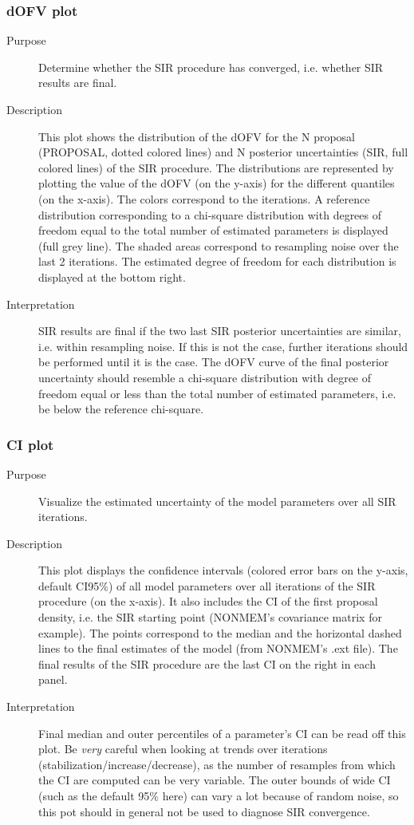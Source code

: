 \subsubsection{dOFV plot}
\begin{description}
\item[Purpose] Determine whether the SIR procedure has converged, i.e. whether SIR results are final.
\item[Description] This plot shows the distribution of the dOFV for the N proposal (PROPOSAL, dotted colored lines) and N posterior uncertainties (SIR, full colored lines) of the SIR procedure. The distributions are represented by plotting the value of the dOFV (on the y-axis) for the different quantiles (on the x-axis). The colors correspond to the iterations. A reference distribution corresponding to a chi-square distribution with degrees of freedom equal to the total number of estimated parameters is displayed (full grey line). The shaded areas correspond to resampling noise over the last 2 iterations. The estimated degree of freedom for each distribution is displayed at the bottom right.
\item[Interpretation] SIR results are final if the two last SIR posterior uncertainties are similar, i.e. within resampling noise. If this is not the case, further iterations should be performed until it is the case. The dOFV curve of the final posterior uncertainty should resemble a chi-square distribution with degree of freedom equal or less than the total number of estimated parameters, i.e. be below the reference chi-square.
\end{description}
\subsubsection{CI plot}
\begin{description}
\item[Purpose] Visualize the estimated uncertainty of the model parameters over all SIR iterations. 
\item[Description] This plot displays the confidence intervals (colored error bars on the y-axis, default CI95\%) 
of all model parameters over all iterations of the SIR procedure (on the x-axis). It also includes the CI of the first proposal density, i.e. the SIR starting point (NONMEM’s covariance matrix for example). The points correspond to the median and the horizontal dashed lines to the final estimates of the model (from NONMEM’s .ext file). The final results of the SIR procedure are the last CI on the right in each panel.
\item[Interpretation] Final median and outer percentiles of a parameter’s CI can be read off this plot. Be \emph{very} 
careful when looking at trends over iterations (stabilization/increase/decrease), as the number of resamples from which the CI are computed can be very variable. The outer bounds of wide CI (such as the default 95\% here) 
can vary a lot because of random noise, so this pot should in general not be used to diagnose SIR convergence.
\end{description}
